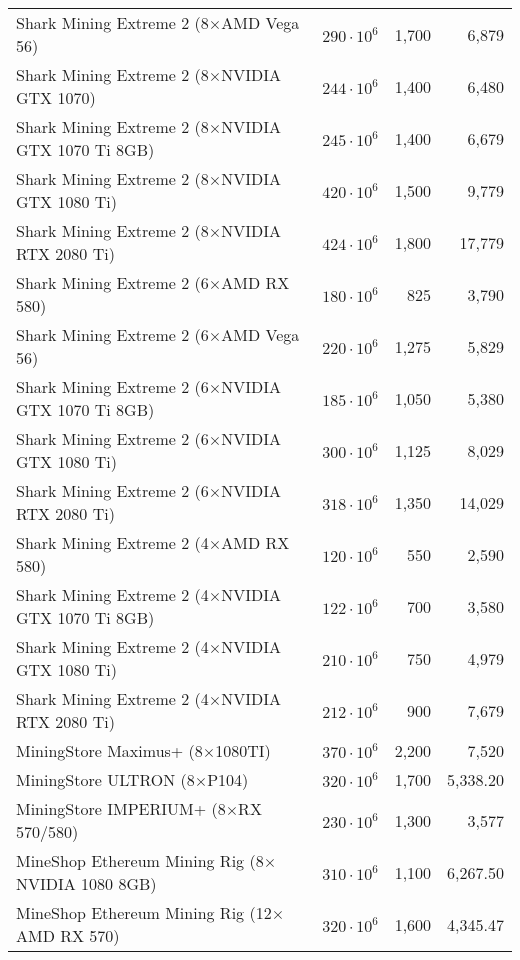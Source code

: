 \begin{longtable}{|p{}|r|r|r|}
  Shark Mining Extreme 2 (8$\times$AMD Vega 56)               & $290 \cdot 10^6$ & 1,700 & 6,879 \\
  Shark Mining Extreme 2 (8$\times$NVIDIA GTX 1070)           & $244 \cdot 10^6$ & 1,400 & 6,480 \\
  Shark Mining Extreme 2 (8$\times$NVIDIA GTX 1070 Ti 8GB)   & $245 \cdot 10^6$ & 1,400 & 6,679 \\
  Shark Mining Extreme 2 (8$\times$NVIDIA GTX 1080 Ti)        & $420 \cdot 10^6$ & 1,500 & 9,779 \\
  Shark Mining Extreme 2 (8$\times$NVIDIA RTX 2080 Ti)        & $424 \cdot 10^6$ & 1,800 & 17,779 \\
  Shark Mining Extreme 2 (6$\times$AMD RX 580)                & $180 \cdot 10^6$ & 825 & 3,790 \\
  Shark Mining Extreme 2 (6$\times$AMD Vega 56)               & $220 \cdot 10^6$ & 1,275 & 5,829 \\
  Shark Mining Extreme 2 (6$\times$NVIDIA GTX 1070 Ti 8GB)   & $185 \cdot 10^6$ & 1,050 & 5,380 \\
  Shark Mining Extreme 2 (6$\times$NVIDIA GTX 1080 Ti)        & $300 \cdot 10^6$ & 1,125 & 8,029 \\
  Shark Mining Extreme 2 (6$\times$NVIDIA RTX 2080 Ti)        & $318 \cdot 10^6$ & 1,350 & 14,029 \\
  Shark Mining Extreme 2 (4$\times$AMD RX 580)                & $120 \cdot 10^6$ & 550 & 2,590 \\
  Shark Mining Extreme 2 (4$\times$NVIDIA GTX 1070 Ti 8GB)   & $122 \cdot 10^6$ & 700 & 3,580 \\
  Shark Mining Extreme 2 (4$\times$NVIDIA GTX 1080 Ti)        & $210 \cdot 10^6$ & 750 & 4,979 \\
  Shark Mining Extreme 2 (4$\times$NVIDIA RTX 2080 Ti)        & $212 \cdot 10^6$ & 900 & 7,679 \\
  MiningStore Maximus+ (8$\times$1080TI)                            & $370 \cdot 10^6$ & 2,200 & 7,520 \\
  MiningStore ULTRON (8$\times$P104)                                & $320 \cdot 10^6$ & 1,700 & 5,338.20 \\
  MiningStore IMPERIUM+ (8$\times$RX 570/580)                       & $230 \cdot 10^6$ & 1,300 & 3,577 \\
  MineShop Ethereum Mining Rig (8$\times$NVIDIA 1080 8GB)       & $310 \cdot 10^6$ & 1,100 & 6,267.50 \\
  MineShop Ethereum Mining Rig (12$\times$AMD RX 570)           & $320 \cdot 10^6$ & 1,600 & 4,345.47 \\

\end{longtable}
